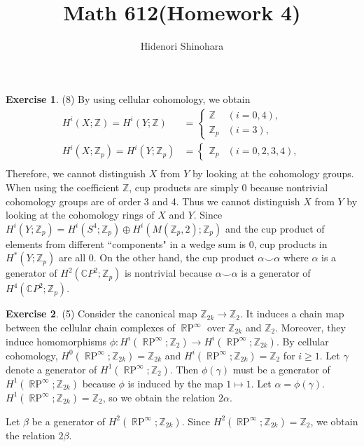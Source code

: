 \documentclass[12pt, psamsfonts]{amsart}
\theoremstyle{definition}
\newtheorem*{exer}{Exercise}
\theoremstyle{remark}
\DeclareMathOperator{\RP}{\mathbb{R}P}
\numberwithin{equation}{section}
\begin{document}
\title{Math 612(Homework 4)}
\author{Hidenori Shinohara}
\maketitle

\begin{exer}{(8)}
  By using cellular cohomology, we obtain 
  \begin{align*}
    H^i(X; \mathbb{Z}) = H^i(Y; \mathbb{Z}) &= \begin{cases}
      \mathbb{Z} & (i = 0, 4), \\
      \mathbb{Z}_p & (i = 3),
    \end{cases} \\
    H^i(X; \mathbb{Z}_p) = H^i(Y; \mathbb{Z}_p) &= \begin{cases}
      \mathbb{Z}_p & (i = 0, 2, 3, 4),
    \end{cases} \\
  \end{align*}
  Therefore, we cannot distinguish $X$ from $Y$ by looking at the cohomology groups.
  When using the coefficient $\mathbb{Z}$, cup products are simply 0 because nontrivial cohomology groups are of order 3 and 4.
  Thus we cannot distinguish $X$ from $Y$ by looking at the cohomology rings of $X$ and $Y$.
  Since $H^i(Y; \mathbb{Z}_p) = H^i(S^4; \mathbb{Z}_p) \oplus H^i(M(\mathbb{Z}_p, 2); \mathbb{Z}_p)$ and the cup product of elements from different ``components" in a wedge sum is 0, cup products in $H^{\ast}(Y; \mathbb{Z}_p)$ are all 0.
  On the other hand, the cup product $\alpha \smile \alpha$ where $\alpha$ is a generator of $H^2(\mathbb{C}P^2; \mathbb{Z}_p)$ is nontrivial because $\alpha \smile \alpha$ is a generator of $H^4(\mathbb{C}P^2; \mathbb{Z}_p)$.
\end{exer}

\begin{exer}{(5)}
  Consider the canonical map $\mathbb{Z}_{2k} \rightarrow \mathbb{Z}_2$.
  It induces a chain map between the cellular chain complexes of $\RP^{\infty}$ over $\mathbb{Z}_{2k}$ and $\mathbb{Z}_2$.
  Moreover, they induce homomorphisms $\phi: H^i(\RP^{\infty};\mathbb{Z}_{2}) \rightarrow H^i(\RP^{\infty};\mathbb{Z}_{2k})$.
  By cellular cohomology, $H^0(\RP^{\infty}; \mathbb{Z}_{2k}) = \mathbb{Z}_{2k}$ and $H^i(\RP^{\infty}; \mathbb{Z}_{2k}) = \mathbb{Z}_2$ for $i \geq 1$.
  Let $\gamma$ denote a generator of $H^1(\RP^{\infty};\mathbb{Z}_2)$.
  Then $\phi(\gamma)$ must be a generator of $H^1(\RP^{\infty};\mathbb{Z}_{2k})$ because $\phi$ is induced by the map $1 \mapsto 1$.
  Let $\alpha = \phi(\gamma)$.
  $H^1(\RP^{\infty}; \mathbb{Z}_{2k}) = \mathbb{Z}_2$, so we obtain the relation $2\alpha$.

  Let $\beta$ be a generator of $H^2(\RP^{\infty};\mathbb{Z}_{2k})$.
  Since $H^2(\RP^{\infty};\mathbb{Z}_{2k}) = \mathbb{Z}_2$, we obtain the relation $2\beta$.
\end{exer}
\end{document}
